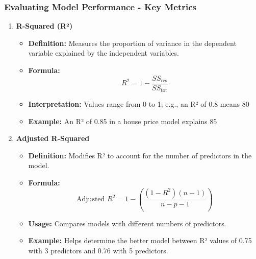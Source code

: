 \documentclass{beamer}
\begin{document}
\begin{frame}[fragile]
    \frametitle{Evaluating Model Performance - Key Metrics}
    \begin{enumerate}
        \item \textbf{R-Squared (R²)}
            \begin{itemize}
                \item \textbf{Definition:} Measures the proportion of variance in the dependent variable explained by the independent variables.
                \item \textbf{Formula:}
                  \begin{equation}
                    R^2 = 1 - \frac{SS_{\text{res}}}{SS_{\text{tot}}}
                  \end{equation}
                \item \textbf{Interpretation:} Values range from 0 to 1; e.g., an R² of 0.8 means 80%
                \item \textbf{Example:} An R² of 0.85 in a house price model explains 85%
            \end{itemize}

        \item \textbf{Adjusted R-Squared}
            \begin{itemize}
                \item \textbf{Definition:} Modifies R² to account for the number of predictors in the model.
                \item \textbf{Formula:}
                  \begin{equation}
                    \text{Adjusted } R^2 = 1 - \left( \frac{(1 - R^2)(n - 1)}{n - p - 1} \right)
                  \end{equation}
                \item \textbf{Usage:} Compares models with different numbers of predictors.
                \item \textbf{Example:} Helps determine the better model between R² values of 0.75 with 3 predictors and 0.76 with 5 predictors.
            \end{itemize}
    \end{enumerate}
\end{frame}
\end{document}

